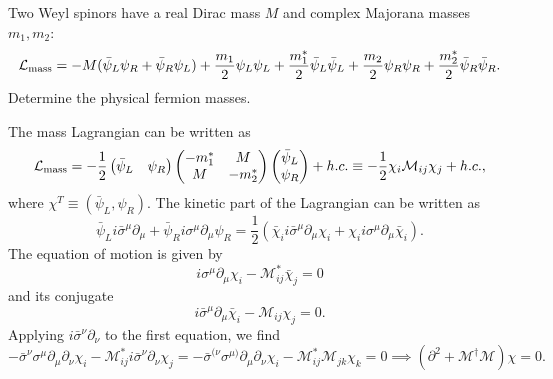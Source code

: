 Two Weyl spinors have a real Dirac mass $M$ and complex Majorana
masses $m_1,m_2$:
\begin{equation}
    \mathcal L_{\rm mass}
    =-M(\bar\psi_L\psi_R+\bar\psi_R\psi_L)
    +\frac{m_1}{2}\psi_L\psi_L
    +\frac{m_1^*}{2}\bar\psi_L\bar\psi_L
    +\frac{m_2}{2}\psi_R\psi_R
    +\frac{m_2^*}{2}\bar\psi_R\bar\psi_R.
\end{equation}
Determine the physical fermion masses.
\begin{solution}
    The mass Lagrangian can be written as
    \begin{equation}
        \mathcal L_{\rm mass} = -\frac{1}{2}\begin{pmatrix}
            \bar \psi _L & \psi_R
        \end{pmatrix}\begin{pmatrix}
            -m_1^* & M\\ M & -m_2^*
        \end{pmatrix}\begin{pmatrix}
            \bar \psi _L \\ \psi_R
        \end{pmatrix} + h.c. \equiv -\frac{1}{2} \chi_i \mathcal{M}_{ij}\chi_j + h.c.,
    \end{equation}
    where $\chi^T \equiv (\bar \psi_L, \psi_R)$.
    The kinetic part of the Lagrangian can be written as
    \begin{equation}
        \bar \psi_L i\bar \sigma^\mu \partial_\mu + \bar\psi_R i\sigma^\mu \partial_\mu \psi_R = \frac{1}{2}(
\bar\chi_i i\bar\sigma^\mu\partial_\mu\chi_i
+
\chi_i i\sigma^\mu\partial_\mu\bar\chi_i).
    \end{equation}
    The equation of motion is given by
    \begin{equation}
        i \sigma^\mu \partial_\mu \chi_i -\mathcal{M}_{ij}^*\bar \chi_j = 0
    \end{equation}
    and its conjugate
    \begin{equation}
        i\bar \sigma^\mu \partial_\mu \bar\chi_i - \mathcal{M}_{ij}\chi_j  = 0.
    \end{equation}
    Applying $i\bar\sigma^\nu  \partial_\nu$ to the first equation, we find
    \begin{equation}
        -\bar\sigma^\nu \sigma^\mu \partial_\mu \partial_\nu \chi_i - \mathcal{M}_{ij}^*i\bar\sigma^\nu \partial_\nu \chi_j =-\bar\sigma^{(\nu} \sigma^{\mu)} \partial_\mu \partial_\nu \chi_i - \mathcal{M}_{ij}^*\mathcal{M}_{jk}\chi_k = 0 \implies (\partial^2 + \mathcal{M}^\dagger\mathcal{M}) \chi = 0.

\end{equation}
\end{solution}

